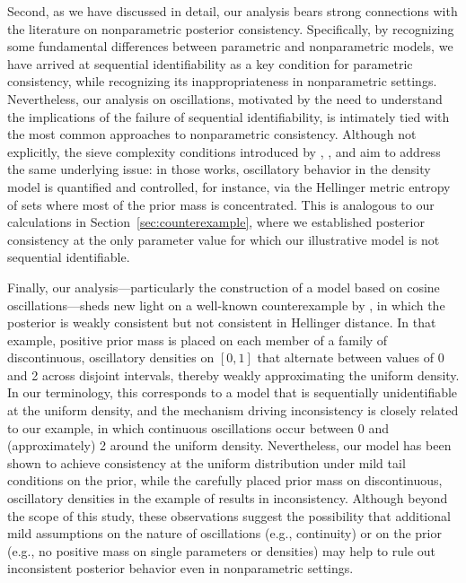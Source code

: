 \documentclass[11pt,twoside]{article}
\begin{document}
Second, as we have discussed in detail, our analysis bears strong connections with the literature on nonparametric posterior consistency. Specifically, by recognizing some fundamental differences between parametric and nonparametric models, we have arrived at sequential identifiability as a key condition for parametric consistency, while recognizing its inappropriateness in nonparametric settings. Nevertheless, our analysis on oscillations, motivated by the need to understand the implications of the failure of sequential identifiability, is intimately tied with the most common approaches to nonparametric consistency. Although not explicitly, the sieve complexity conditions introduced by \cite{barron1999}, \cite{ghosal1999}, and \cite{walker2004squarerootsum} aim to address the same underlying issue: in those works, oscillatory behavior in the density model is quantified and controlled, for instance, via the Hellinger metric entropy of sets where most of the prior mass is concentrated. This is analogous to our calculations in Section~\ref{sec:counterexample}, where we established posterior consistency at the only parameter value for which our illustrative model is not sequential identifiable.


Finally, our analysis—particularly the construction of a model based on cosine oscillations—sheds new light on a well-known counterexample by \cite{barron1999}, in which the posterior is weakly consistent but not consistent in Hellinger distance. In that example, positive prior mass is placed on each member of a family of discontinuous, oscillatory densities on $[0,1]$ that alternate between values of 0 and 2 across disjoint intervals, thereby weakly approximating the uniform density. In our terminology, this corresponds to a model that is sequentially unidentifiable at the uniform density, and the mechanism driving inconsistency is closely related to our example, in which continuous oscillations occur between 0 and (approximately) 2 around the uniform density. Nevertheless, our model has been shown to achieve consistency at the uniform distribution under mild tail conditions on the prior, while the carefully placed prior mass on discontinuous, oscillatory densities in the example of \cite{barron1999} results in inconsistency. Although beyond the scope of this study, these observations suggest the possibility that additional mild assumptions on the nature of oscillations (e.g., continuity) or on the prior (e.g., no positive mass on single parameters or densities) may help to rule out inconsistent posterior behavior even in nonparametric settings.
\end{document}
